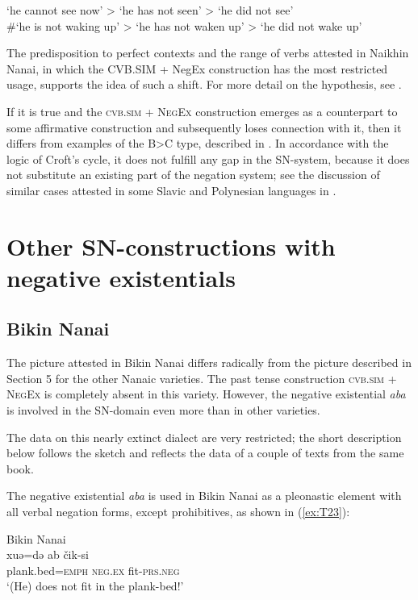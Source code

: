 \documentclass[output=paper]{langscibook}
\begin{document}
\begin{exe}
    \ex ‘he cannot see now’ > ‘he has not seen’ > ‘he did not see’\\
    \#‘he is not waking up’ > ‘he has not waken up’ > ‘he did not wake up’
\end{exe}

The predisposition to perfect contexts and the range of verbs attested in Naikhin Nanai, in which the CVB.SIM + NegEx construction has the most restricted usage, supports the idea of such a shift. For more detail on the hypothesis, see \citet{oskolskaya2017a}.

If it is true and the \textsc{cvb.sim + NegEx} construction emerges as a counterpart to some affirmative construction and subsequently loses connection with it, then it differs from examples of the B>C type, described in \citet{Croft1991}. In accordance with the logic of Croft’s cycle, it does not fulfill any gap in the SN-system, because it does not substitute an existing part of the negation system; see the discussion of similar cases attested in some Slavic and Polynesian languages in \citet{Veselinova2014, Veselinova2016}.

\section{Other SN-constructions with negative existentials}\label{sec:T6}

\subsection{Bikin Nanai}\label{sec:T6.1}

The picture attested in Bikin Nanai differs radically from the picture described in Section 5 for the other Nanaic varieties. The past tense construction \textsc{cvb.sim + NegEx} is completely absent in this variety. However, the negative existential \textit{aba} is involved in the SN-domain even more than in other varieties.

The data on this nearly extinct dialect are very restricted; the short description below follows the sketch \citep{sem1976a} and reflects the data of a couple of texts from the same book.

The negative existential \textit{aba} is used in Bikin Nanai as a pleonastic element with all verbal negation forms, except prohibitives, as shown in (\ref{ex:T23}):

\ea Bikin Nanai \label{ex:T23}\\
	\gll xuə=də	ab	čik-si\\
	plank.bed=\textsc{emph}	\textsc{neg.ex}	fit-\textsc{prs.neg}\\
	\glt `(He) does not fit in the plank-bed!' \citep[text 2]{sem1976a}
\z
\end{document}
